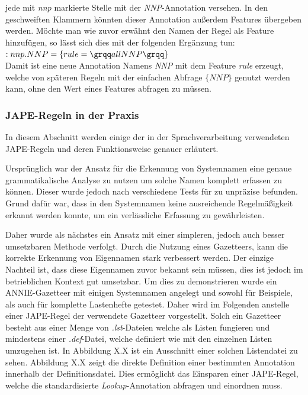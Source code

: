 \documentclass[12pt]{report}
\begin{document}
jede mit \textit{nnp} markierte Stelle mit der \textit{NNP}-Annotation versehen. In den geschweiften Klammern könnten dieser Annotation außerdem Features übergeben werden. Möchte man wie zuvor erwähnt den Namen der Regel als Feature hinzufügen, so lässt sich dies mit der folgenden Ergänzung tun:\\

$:nnp.NNP=\{rule=\grqq allNNP\grqq \}$\\

Damit ist eine neue Annotation Namens \textit{NNP} mit dem Feature \textit{rule} erzeugt, welche von späteren Regeln mit der einfachen Abfrage $\{NNP\}$ genutzt werden kann, ohne den Wert eines Features abfragen zu müssen.

\subsubsection{JAPE-Regeln in der Praxis}
In diesem Abschnitt werden einige der in der Sprachverarbeitung verwendeten JAPE-Regeln und deren Funktionsweise genauer erläutert. 

Ursprünglich war der Ansatz für die Erkennung von Systemnamen eine genaue grammatikalische Analyse zu nutzen um solche Namen komplett erfassen zu können. Dieser wurde jedoch nach verschiedene Tests für zu unpräzise befunden. Grund dafür war, dass in den Systemnamen keine ausreichende Regelmäßigkeit erkannt werden konnte, um ein verlässliche Erfassung zu gewährleisten. 

Daher wurde als nächstes ein Ansatz mit einer simpleren, jedoch auch besser umsetzbaren Methode verfolgt. Durch die Nutzung eines Gazetteers, kann die korrekte Erkennung von Eigennamen stark verbessert werden. Der einzige Nachteil ist, dass diese Eigennamen zuvor bekannt sein müssen, dies ist jedoch im betrieblichen Kontext gut umsetzbar. Um dies zu demonstrieren wurde ein ANNIE-Gazetteer mit einigen Systemnamen angelegt und sowohl für Beispiele, als auch für komplette Lastenhefte getestet. Daher wird im Folgenden anstelle einer JAPE-Regel der verwendete Gazetteer vorgestellt. Solch ein Gazetteer besteht aus einer Menge von \textit{.lst}-Dateien welche als Listen fungieren und mindestens einer \textit{.def}-Datei, welche definiert wie mit den einzelnen Listen umzugehen ist. In Abbildung X.X ist ein Ausschnitt einer solchen Listendatei zu sehen. Abbildung X.X zeigt die direkte Definition einer bestimmten Annotation innerhalb der Definitionsdatei. Dies ermöglicht das Einsparen einer JAPE-Regel, welche die standardisierte \textit{Lookup}-Annotation abfragen und einordnen muss.
\end{document}
